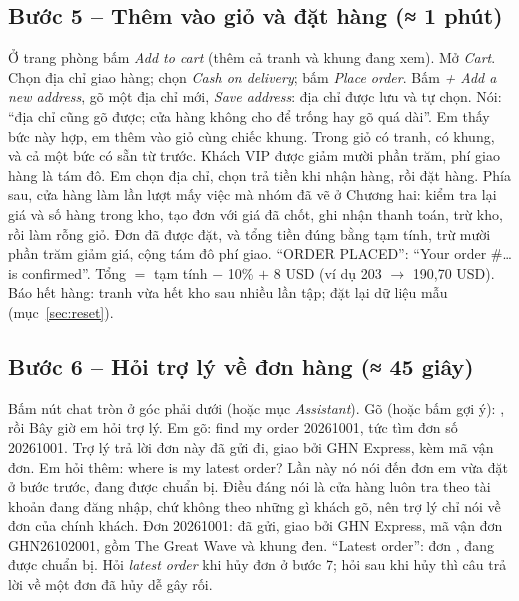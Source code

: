 \subsection{Bước 5 -- Thêm vào giỏ và đặt hàng \normalfont\small(≈ 1 phút)}
Ở trang phòng bấm \emph{Add to cart} (thêm cả tranh và khung đang xem). Mở \emph{Cart}. Chọn địa chỉ giao hàng; chọn \emph{Cash on delivery}; bấm \emph{Place order}.
Bấm \emph{+ Add a new address}, gõ một địa chỉ mới, \emph{Save address}: địa chỉ được lưu và tự chọn. Nói: ``địa chỉ cũng gõ được; cửa hàng không cho để trống hay gõ quá dài''.
Em thấy bức này hợp, em thêm vào giỏ cùng chiếc khung.  Trong giỏ có tranh, có khung, và cả một bức có sẵn từ trước. Khách VIP được giảm mười phần trăm, phí giao hàng là tám đô.  Em chọn địa chỉ, chọn trả tiền khi nhận hàng, rồi đặt hàng. Phía sau, cửa hàng làm lần lượt mấy việc mà nhóm đã vẽ ở Chương hai: kiểm tra lại giá và số hàng trong kho, tạo đơn với giá đã chốt, ghi nhận thanh toán, trừ kho, rồi làm rỗng giỏ.  Đơn đã được đặt, và tổng tiền đúng bằng tạm tính, trừ mười phần trăm giảm giá, cộng tám đô phí giao.
``ORDER PLACED'': ``Your order \#\ldots{} is confirmed''. Tổng $=$ tạm tính $-$ 10\% $+$ 8 USD (ví dụ 203 $\to$ 190,70 USD).
Báo hết hàng: tranh vừa hết kho sau nhiều lần tập; đặt lại dữ liệu mẫu (mục~\ref{sec:reset}).

\subsection{Bước 6 -- Hỏi trợ lý về đơn hàng \normalfont\small(≈ 45 giây)}
Bấm nút chat tròn ở góc phải dưới (hoặc mục \emph{Assistant}). Gõ (hoặc bấm gợi ý): , rồi 
Bây giờ em hỏi trợ lý.  Em gõ: find my order 20261001, tức tìm đơn số 20261001. Trợ lý trả lời đơn này đã gửi đi, giao bởi GHN Express, kèm mã vận đơn. Em hỏi thêm: where is my latest order? Lần này nó nói đến đơn em vừa đặt ở bước trước, đang được chuẩn bị. Điều đáng nói là cửa hàng luôn tra theo tài khoản đang đăng nhập, chứ không theo những gì khách gõ, nên trợ lý chỉ nói về đơn của chính khách.
Đơn 20261001: đã gửi, giao bởi GHN Express, mã vận đơn GHN26102001, gồm The Great Wave và khung đen. ``Latest order'': đơn , đang được chuẩn bị.
Hỏi \emph{latest order}  khi hủy đơn ở bước 7; hỏi sau khi hủy thì câu trả lời về một đơn đã hủy dễ gây rối.

